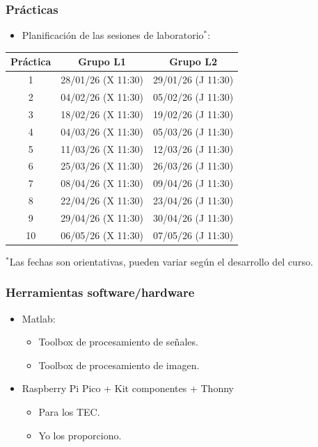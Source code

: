 \begin{frame}[fragile]\frametitle{Prácticas}
  \begin{itemize}
    \item \color{red}Planificación de las sesiones de laboratorio$^*$:\color{black}
  \end{itemize}
  \begin{center}
    \begin{tabular}{|c|c|c|}\hline
      \textbf{Práctica} & \textbf{Grupo L1} & \textbf{Grupo L2} \\\hline
       1 & 28/01/26 (X 11:30) & 29/01/26 (J 11:30) \\\hline
       2 & 04/02/26 (X 11:30) & 05/02/26 (J 11:30) \\\hline
       3 & 18/02/26 (X 11:30) & 19/02/26 (J 11:30) \\\hline
       4 & 04/03/26 (X 11:30) & 05/03/26 (J 11:30) \\\hline
       5 & 11/03/26 (X 11:30) & 12/03/26 (J 11:30) \\\hline
       6 & 25/03/26 (X 11:30) & 26/03/26 (J 11:30) \\\hline
       7 & 08/04/26 (X 11:30) & 09/04/26 (J 11:30) \\\hline
       8 & 22/04/26 (X 11:30) & 23/04/26 (J 11:30) \\\hline
       9 & 29/04/26 (X 11:30) & 30/04/26 (J 11:30) \\\hline
      10 & 06/05/26 (X 11:30) & 07/05/26 (J 11:30) \\\hline
    \end{tabular}
  \end{center}
  {\footnotesize $^*$Las fechas son orientativas, pueden variar según el desarrollo del curso.}
\end{frame}

\begin{frame}
  \frametitle{Herramientas software/hardware}
  \vspace{0.2cm}
  \begin{itemize}
    \item \alert{Matlab:}
    \vspace{0.2cm}
    \begin{itemize}
      \item Toolbox de procesamiento de señales.\vspace{0.2cm}
      \item Toolbox de procesamiento de imagen.\vspace{0.2cm}
    \end{itemize}
    
    \vspace{0.2cm}
    \item <2->   \alert{Raspberry Pi Pico + Kit componentes + Thonny}
    \begin{itemize} \vspace{0.2cm}
      \item Para los TEC.\vspace{0.2cm}
      \item Yo los proporciono.
    \end{itemize}
  \end{itemize}
\end{frame}
  
